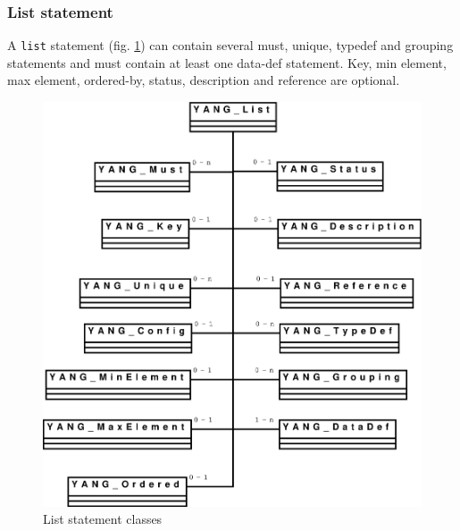 \documentclass[a4paper]{article}
\begin{document}
\subsubsection{List statement}

A {\tt list} statement (fig. \ref{list}) can contain several must,
unique, typedef and grouping statements and must contain at least one
data-def statement.  Key, min element, max element, ordered-by,
status, description and reference are optional.
\begin{figure}[htbp]
\begin{center}
\includegraphics[scale = .3]{list.eps}
\end{center}
\caption{List statement classes}
\label{list}
\end{figure}
\end{document}
